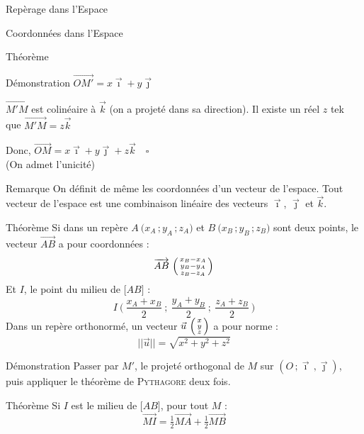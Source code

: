 \documentclass{cours}
\begin{document}
\begin{Gpartie}{Repèrage dans l'Espace}
\begin{Spartie}{Coordonnées dans l'Espace}
\begin{SSpartie}{Théorème}
\begin{SSSpartie}{Démonstration}
                    $\overrightarrow{OM'}=x\vec{\imath}+y\vec{\jmath}$

                    $\overrightarrow{M'M}$ est colinéaire à $\vec{k}$ (on a projeté dans sa direction). Il existe un réel $z$ tek que $\overrightarrow{M'M}=z\vec{k}$

                    Donc, $\overrightarrow{OM}=x\vec{\imath}+y\vec{\jmath}+z\vec{k}\quad\square$ \\
                    (On admet l'unicité)
                \end{SSSpartie}
                \begin{SSSpartie}{Remarque} 
                    On définit de même les coordonnées d'un vecteur de l'espace. Tout vecteur de l'espace est une combinaison linéaire des vecteurs $\vec{\imath}$, $\vec{\jmath}$ et $\vec{k}$.
                \end{SSSpartie}
            \end{SSpartie}
            \begin{SSpartie}{Théorème} 
                Si dans un repère $A~\big(x_A\,; y_A\,; z_A\big)$ et $B~\big(x_B\,; y_B\,; z_B\big)$ sont deux points, le vecteur $\overrightarrow{AB}$ a pour coordonnées : 
                \[\overrightarrow{AB}~\begin{psmallmatrix} x_B-x_A \\ y_B-y_A \\ z_B-z_A \end{psmallmatrix}\]
                Et $I$, le point du milieu de $\big[AB\big]$ :
                \[I~\Bigg(~\frac{x_A+x_B}{2}~;~\frac{y_A+y_B}{2}~;~\frac{z_A+z_B}{2}~\Bigg)\]
                Dans un repère orthonormé, un vecteur $\vec{u}~\begin{psmallmatrix}x \\ y \\ z\end{psmallmatrix}$ a pour norme :
                \[\lvert\lvert\vec{u}\rvert\rvert=\sqrt{x^2+y^2+z^2}\]
                \begin{SSSpartie}{Démonstration} 
                    Passer par $M'$, le projeté orthogonal de $M$ sur $\left(O\,;\vec{\imath}\,,\vec{\jmath}\right)$, puis appliquer le théorème de \textsc{Pythagore} deux fois.
                \end{SSSpartie}
            \end{SSpartie}
            \begin{SSpartie}{Théorème} 
                Si $I$ est le milieu de $\big[AB\big]$, pour tout $M$ :
                \[\overrightarrow{MI}=\tfrac{1}{2}\overrightarrow{MA}+\tfrac{1}{2}\overrightarrow{MB}\]

\end{SSpartie}
\end{Spartie}
\end{Gpartie}
\end{document}
